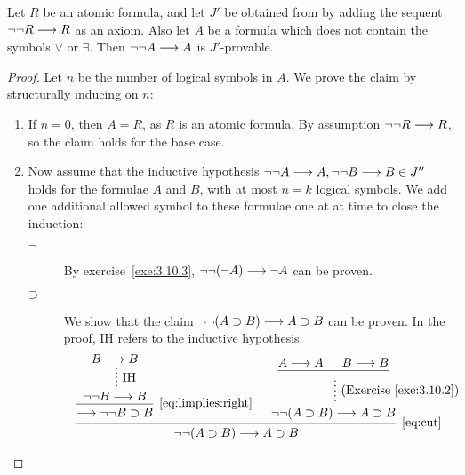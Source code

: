 \documentclass[11pt,a4paper]{article}
\begin{document}
\begin{example}[3.11]\label{exa:3.11}
    Let \(R\) be an atomic formula, and let \(J'\) be obtained from \LJ{} by adding the sequent~\(\lnot\lnot R\longrightarrow R\) as an axiom.
    Also let \(A\) be a formula which does not contain the symbols \(\lor\) or \(\exists\).
    Then \(\lnot\lnot A\longrightarrow A\) is \(J'\)-provable.

    \begin{proof}
        Let \(n\) be the number of logical symbols in \(A\).
        We prove the claim by structurally inducing on \(n\):
        \begin{enumerate}
            \item
                If \(n = 0\), then \(A = R\), as \(R\) is an atomic formula.
                By assumption \(\lnot\lnot R \longrightarrow R\), so the claim holds for the base case.
            \item
                Now assume that the inductive hypothesis \(\lnot\lnot A\longrightarrow A, \lnot\lnot B\longrightarrow B \in J''\) holds for the formulae \(A\) and \(B\),
                with at most \(n = k\) logical symbols. We add one additional allowed symbol to these formulae one at at time to close the induction:
                \begin{description}
                    \item[\(\lnot\)]
                        By exercise~\ref{exe:3.10.3}, \(\lnot\lnot(\lnot A)\longrightarrow\lnot A\) can be proven.
                    \item[\(\supset\)]
                        We show that the claim \(\lnot\lnot(A\supset B) \longrightarrow A\supset B\) can be proven.
                        In the proof, IH refers to the inductive hypothesis:
                        \begin{equation*}
                            \begin{prooftree}
                                \hypo{B\seq B}
                                \ellipsis{\IH}{\lnot\lnot B\seq B}
                                \infer1[\eqref{eq:limplies:right}]{\seq\lnot\lnot B\limplies B}
                                \hypo{A\seq A}
                                \hypo{B\seq B}
                                \infer2{}
                                \ellipsis{(Exercise~\ref{exe:3.10.2})}{\lnot\lnot\arcs{A\limplies B} \seq A\limplies B}
                                \infer2[\eqref{eq:cut}]{\lnot\lnot\arcs{A\limplies B} \seq A\limplies B}
                            \end{prooftree}
                        \end{equation*}

\end{description}
\end{enumerate}
\end{proof}
\end{example}
\end{document}
